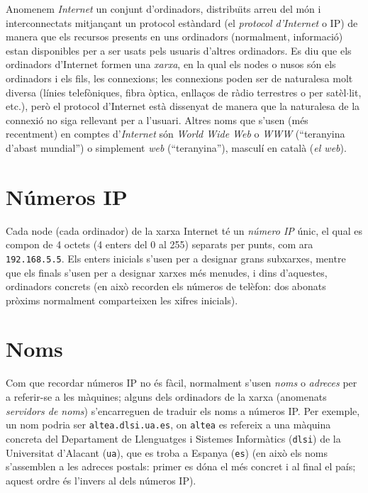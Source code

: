 Anomenem \emph{Internet}  un conjunt d'ordinadors, distribu\"{\i}ts
arreu del món i interconnectats mitjançant un protocol
estàndard (el \emph{protocol d'Internet} o IP) de manera que els recursos
presents en uns ordinadors (normalment, informació) estan
disponibles per a ser usats pels usuaris d'altres ordinadors. Es diu que
els ordinadors d'Internet formen una \emph{xarxa}, en la qual els nodes
o nusos són els ordinadors i els fils, les connexions; les connexions
poden ser de naturalesa molt diversa (línies telefòniques,
fibra òptica, enllaços de ràdio terrestres o per
satèl$\cdot$lit, etc.), però el protocol d'Internet 
està dissenyat de manera que la naturalesa de la connexió no siga
rellevant per a l'usuari. Altres noms que s'usen
(més recentment) en comptes d'\emph{Internet} són \emph{World Wide Web} o
\emph{WWW} (``teranyina d'abast mundial'') o simplement \emph{web}
(``teranyina''), masculí en català (\emph{el web}).

\section{Números IP}
Cada node (cada ordinador) de la xarxa Internet té un {\em
número IP} únic, el qual es compon de 4 octets (4 enters del 0
al 255) separats per punts, com ara {\tt 192.168.5.5}. Els enters
inicials s'usen per a designar grans subxarxes, mentre que els finals
s'usen per a designar xarxes més menudes, i dins d'aquestes, ordinadors
concrets (en això recorden els números de telèfon:
dos abonats pròxims normalment comparteixen les xifres inicials).

\section{Noms}
Com que recordar números IP no és fàcil, normalment s'usen
\emph{noms} o \emph{adreces} per a referir-se a les màquines; alguns
dels ordinadors de la xarxa (anomenats \emph{servidors de noms})
s'encarreguen de traduir els noms a números IP.  Per exemple, un
nom podria ser {\tt altea.dlsi.ua.es}, on {\tt altea} es refereix a
una màquina concreta del Departament de Llenguatges i Sistemes
Informàtics ({\tt dlsi}) de la Universitat d'Alacant ({\tt ua}),
que es troba a Espanya ({\tt es}) (en això els noms s'assemblen a
les adreces postals: primer es dóna el més concret i al final
el país; aquest ordre és l'invers al dels números IP).

